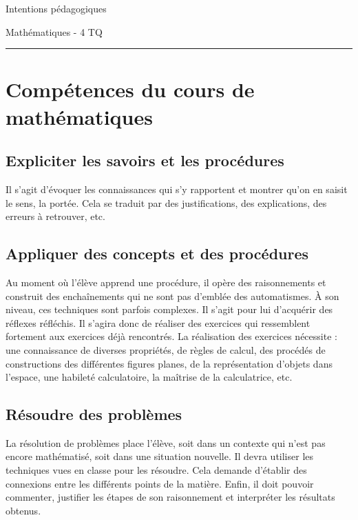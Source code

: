 \documentclass[parskip=half-, numbers=enddot]{scrartcl}
\begin{document}
\begin{center}
    \bfseries
    \begin{Huge}
        Intentions pédagogiques
    \end{Huge}
    \smallbreak
    \begin{Large}
        Mathématiques - 4 TQ
    \end{Large}
    \smallbreak
    \rule[10pt]{.3\linewidth}{1 pt}
\end{center}
\section{Compétences du cours de mathématiques}

\subsection{Expliciter les savoirs et les procédures}

Il s'agit d'évoquer les connaissances qui s'y rapportent et montrer
qu'on en saisit le sens, la portée. Cela se traduit par des
justifications, des explications, des erreurs à retrouver, etc.

\subsection{Appliquer des concepts et des procédures}

Au moment où l'élève apprend une procédure, il opère des raisonnements
et construit des enchaînements qui ne sont pas d'emblée des
automatismes. À son niveau, ces techniques sont parfois complexes. Il
s'agit pour lui d'acquérir des réflexes réfléchis. Il s'agira donc de
réaliser des exercices qui ressemblent fortement aux exercices déjà
rencontrés. La réalisation des exercices nécessite : une connaissance de
diverses propriétés, de règles de calcul, des procédés de constructions
des différentes figures planes, de la représentation d'objets dans
l'espace, une habileté calculatoire, la maîtrise de la
calculatrice, etc.

\subsection{Résoudre des problèmes}

La résolution de problèmes place l'élève, soit dans un contexte qui
n'est pas encore mathématisé, soit dans une situation nouvelle. Il devra
utiliser les techniques vues en classe pour les résoudre. Cela demande
d'établir des connexions entre les différents points de la matière.
Enfin, il doit pouvoir commenter, justifier les étapes de son
raisonnement et interpréter les résultats obtenus.
\end{document}
